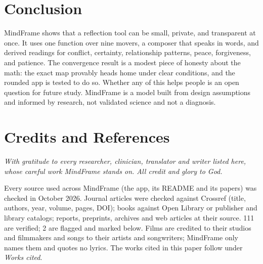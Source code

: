 \documentclass[10pt]{article}
\theoremstyle{definition}
\theoremstyle{remark}
\begin{document}
\section{Conclusion}
MindFrame shows that a reflection tool can be small, private, and transparent at once. It uses one function over nine movers, a composer that speaks in words, and derived readings for conflict, certainty, relationship patterns, peace, forgiveness, and patience. The convergence result is a modest piece of honesty about the math: the exact map provably heads home under clear conditions, and the rounded app is tested to do so. Whether any of this helps people is an open question for future study. MindFrame is a model built from design assumptions and informed by research, not validated science and not a diagnosis.

\section*{Credits and References}
\noindent\emph{With gratitude to every researcher, clinician, translator and writer listed here, whose careful work MindFrame stands on. All credit and glory to God.}

\noindent\small Every source used across MindFrame (the app, its README and its papers) was checked in October 2026. Journal articles were checked against Crossref (title, authors, year, volume, pages, DOI); books against Open Library or publisher and library catalogs; reports, preprints, archives and web articles at their source. 111 are verified; 2 are flagged and marked below. Films are credited to their studios and filmmakers and songs to their artists and songwriters; MindFrame only names them and quotes no lyrics. The works cited in this paper follow under \emph{Works cited}.
\end{document}
